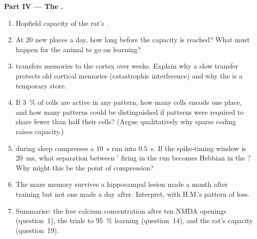 \begin{problem}
\medskip
\noindent\textbf{Part IV --- The .}
\begin{enumerate}[resume]
  \item Hopfield capacity of the rat's .
  \item At $20$ new places a day, how long before the capacity is
        reached? What must happen for the animal to go on learning?
  \item {} transfers memories to the cortex over weeks.
        Explain why a slow transfer protects old cortical memories
        (catastrophic interference) and why the  is a
        temporary store.
  \item If \qty{3}{\%} of  cells are active in any pattern, how many
        cells encode one place, and how many patterns could be
        distinguished if patterns were required to share fewer than
        half their cells? (Argue qualitatively why sparse coding raises
        capacity.)
  \item {} during sleep compresses a \qty{10}{s} run into
        \qty{0.5}{s}. If the spike-timing window is \qty{20}{ms}, what
        separation between ' firing in the run becomes
        Hebbian in the ? Why might this be the point of
        compression?
  \item The maze memory survives a hippocampal lesion made a month
        after training but not one made a day after. Interpret, with
        H.M.'s pattern of loss.
  \item Summarise: the free calcium concentration after ten NMDA
        openings (question~1), the trials to \qty{95}{\%} learning
        (question~14), and the rat's  capacity (question~19).
\end{enumerate}
\end{problem}
